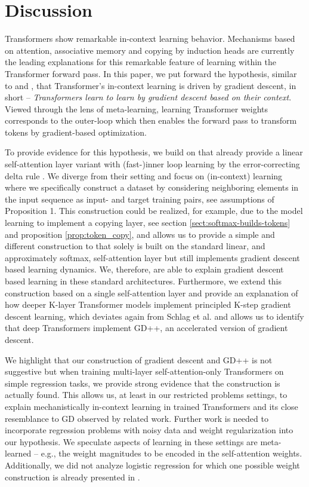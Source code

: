 \documentclass{article}
\theoremstyle{plain}
\theoremstyle{definition}
\theoremstyle{remark}
\begin{document}
\section{Discussion}

Transformers show remarkable in-context learning behavior. Mechanisms based on attention, associative memory and copying by induction heads are currently the leading explanations for this remarkable feature of learning within the Transformer forward pass. In this paper, we put forward the hypothesis, similar to \citet{simple_case_study} and \citet{related_work}, that Transformer's in-context learning is driven by gradient descent, in short -- \textit{Transformers learn to learn by gradient descent based on their context}. Viewed through the lens of meta-learning, learning Transformer weights corresponds to the outer-loop which then enables the forward pass to transform tokens by gradient-based optimization. 

To provide evidence for this hypothesis, we build on \citet{linear_transformers_fast_weight} that already provide a linear self-attention layer variant with (fast-)inner loop learning by the error-correcting delta rule \cite{widrow:switching}. We diverge from their setting and focus on (in-context) learning where we specifically construct a dataset by considering neighboring elements in the input sequence as input- and target training pairs, see  assumptions of Proposition 1. This construction could be realized, for example, due to the model learning to implement a copying layer, see section \ref{sect:softmax-builds-tokens} and proposition \ref{prop:token_copy}, and allows us to provide a simple and different construction to \citet{linear_transformers_fast_weight} that solely is built on the standard linear, and approximately softmax, self-attention layer but still implements gradient descent based learning dynamics. We, therefore, are able to explain gradient descent based learning in these standard architectures. Furthermore, we extend this construction based on a single self-attention layer and provide an explanation of how deeper K-layer Transformer models implement principled K-step gradient descent learning, which deviates again from Schlag et al. and allows us to identify that deep Transformers implement GD++, an accelerated version of gradient descent.

We highlight that our construction of gradient descent and GD++ is not suggestive but when training multi-layer self-attention-only Transformers on simple regression tasks, we provide strong evidence that the construction is actually found. This allows us, at least in our restricted problems settings, to explain mechanistically in-context learning in trained Transformers and its close resemblance to GD observed by related work. Further work is needed to incorporate regression problems with noisy data and weight regularization into our hypothesis. We speculate aspects of learning in these settings are meta-learned -- e.g., the weight magnitudes to be encoded in the self-attention weights. Additionally, we did not analyze logistic regression for which one possible weight construction is already presented in \citet{hypertransformer}.
\end{document}
